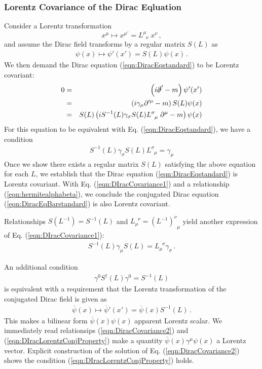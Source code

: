 \subsubsection{Lorentz Covariance of the Dirac Eqluation}
Consider a Lorentz transformation
\begin{equation}
x^\mu \mapsto x^{\mu'} = L^\mu_{\;\;\nu}\; x^\nu\,,
\end{equation}
and assume the Dirac field transforms by a regular matrix $S(L)$ as
\begin{eqnarray}
\psi(x)
\mapsto
\psi'(x') 
= 
S(L) \psi(x)\,.
\end{eqnarray}
We then demand the Dirac equation (\ref{eqn:DiracEqstandard})
to be Lorentz covariant:
\begin{eqnarray}
0 &=& \left( i\slashed{\partial}' - m \right) \psi'(x') 
\nonumber\\
&=&
\left( i \gamma_\mu  \partial'^\mu - m \right) S(L) \psi(x) 
\nonumber\\
&=&
S(L)\left( i S^{-1}(L) \gamma_\sigma S(L)  L^\sigma_{\;\;\mu}\; \partial^\mu - m \right) \psi(x) 
\end{eqnarray}
For this equation to be equivalent with Eq. (\ref{eqn:DiracEqstandard}),
we have a condition
\begin{eqnarray}
S^{-1}(L) \gamma_\sigma S(L)  L^\sigma_{\;\;\mu} = \gamma_\mu
\label{eqn:DIracCovariance1}
\end{eqnarray}
Once we show there exists  a regular matrix $S(L)$ satisfying the above equation for each $L$,
we establish that the Dirac equation  (\ref{eqn:DiracEqstandard}) is Lorentz covariant.
With Eq. (\ref{eqn:DIracCovariance1})  and a relationship (\ref{eqn:hermitealphabeta}),
we conclude the conjugated Dirac equation (\ref{eqn:DiracEqBarstandard})
is also Lorentz covariant. 

Relationships $S(L^{-1}) = S^{-1}(L)$ and 
$L_\mu^{\;\;\nu} = (L^{-1})^\nu_{\;\;\mu}$
yield another expression of Eq. (\ref{eqn:DIracCovariance1}):
\begin{eqnarray}
S^{-1}(L) \gamma_\mu S(L)  = L_\mu^{\;\;\sigma}  \gamma_\sigma
\,.
\label{eqn:DiracCovariance2}
\end{eqnarray}

An additional condition
\begin{eqnarray}
\gamma^0 S^\dagger(L) \gamma^0 = S^{-1}(L)
\label{eqn:DIracLorentzConjProperty}
\end{eqnarray}
is equivalent with a requirement 
that the Lorentz transformation of 
the conjugated Dirac field is given as
\begin{eqnarray}
\overline{\psi}(x)
\mapsto
\overline{\psi}'(x')
=
\overline{\psi}(x) S^{-1}(L)
\label{eqn:DIracConjugateLorentzTransf}
\,.
\end{eqnarray}
This makes a bilinear form $\overline{\psi}(x) \psi(x)$ apparent Lorentz scalar.
We immediately read relationsips (\ref{eqn:DiracCovariance2}) and
 (\ref{eqn:DIracLorentzConjProperty}) 
 make a quantity $\overline{\psi}(x) \gamma^\mu \psi(x)$ a Lorentz vector.
Explicit construction of the solution of Eq. (\ref{eqn:DiracCovariance2})
shows the condition (\ref{eqn:DIracLorentzConjProperty}) holds.


